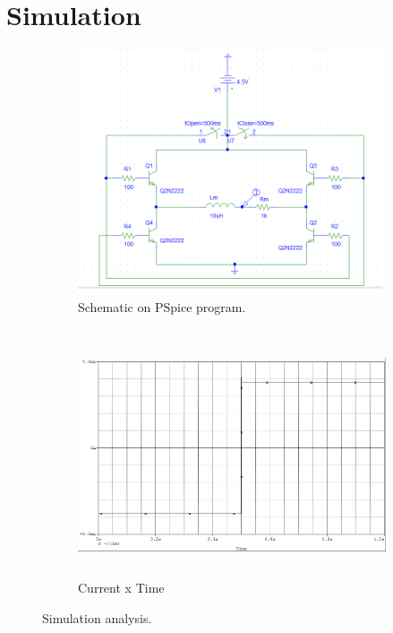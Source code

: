 \section{\textbf{Simulation}}\label{sec:3}

\begin{figure}
\centering
	\begin{subfigure}{.45\textwidth}
    \centering
    \includegraphics[width=\linewidth]{img/schem_pspice.png}
    \caption{Schematic on PSpice program.}\label{fig:schem_pspice}%
    \end{subfigure}    
    \begin{subfigure}{.45\textwidth}
    ~
    \centering
    \includegraphics[width=\linewidth, height=6.4cm]{img/plot.png}
    \caption{Current x Time} \label{fig:plot_ponteh}
	\end{subfigure}
	\caption{Simulation analysis.}
	
\end{figure}

